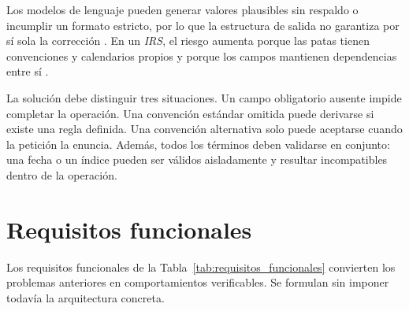 Los modelos de lenguaje pueden generar valores plausibles sin respaldo o incumplir un formato estricto, por lo que la estructura de salida no garantiza por sí sola la corrección \citep{bechard2024structuredrag,tam2024formatrestrictions}. En un \textit{IRS}, el riesgo aumenta porque las patas tienen convenciones y calendarios propios y porque los campos mantienen dependencias entre sí \citep[p.~59]{ausin2025quantitative}.

La solución debe distinguir tres situaciones. Un campo obligatorio ausente impide completar la operación. Una convención estándar omitida puede derivarse si existe una regla definida. Una convención alternativa solo puede aceptarse cuando la petición la enuncia. Además, todos los términos deben validarse en conjunto: una fecha o un índice pueden ser válidos aisladamente y resultar incompatibles dentro de la operación.

\section{Requisitos funcionales}
\label{sec:requisitos_funcionales}

Los requisitos funcionales de la Tabla~\ref{tab:requisitos_funcionales} convierten los problemas anteriores en comportamientos verificables. Se formulan sin imponer todavía la arquitectura concreta.

